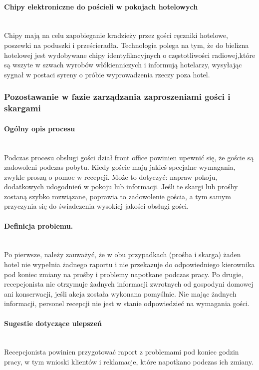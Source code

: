\documentclass[a4paper, 12pt]{article}
\begin{document}
\paragraph{Chipy elektroniczne do pościeli w pokojach hotelowych}\mbox{}\\
\hspace*{1cm} Chipy mają na celu zapobieganie kradzieży przez gości ręczniki hotelowe, poszewki na poduszki i prześcieradła. Technologia polega na tym, że do bielizna hotelowej jest wydobywane chipy identyfikacyjnych o częstotliwości radiowej,które są wszyte w szwach wyrobów włókienniczych i informują hotelarzy, wysyłając sygnał w postaci syreny o próbie wyprowadzenia rzeczy poza hotel.


\subsubsection{Pozostawanie w fazie zarządzania zaproszeniami gości i skargami}
\paragraph{Ogólny opis procesu}\mbox{}\\
\hspace*{1cm} Podczas procesu obsługi gości dział front office powinien upewnić się, że goście są zadowoleni podczas pobytu. Kiedy goście mają jakieś specjalne wymagania, zwykle proszą o pomoc w recepcji. Może to dotyczyć: napraw pokoju, dodatkowych udogodnień w pokoju lub informacji. Jeśli te skargi lub prośby zostaną szybko rozwiązane, poprawia to zadowolenie gościa, a tym samym przyczynia się do świadczenia wysokiej jakości obsługi gości.
\paragraph{Definicja problemu.}\mbox{}\\
\hspace*{1cm} Po pierwsze, należy zauważyć, że w obu przypadkach (prośba i skarga) żaden hotel nie wypełnia żadnego raportu i nie przekazuje do odpowiedniego kierownika pod koniec zmiany na prośby i problemy napotkane podczas pracy. Po drugie, recepcjonista nie otrzymuje żadnych informacji zwrotnych od gospodyni domowej ani konserwacji, jeśli akcja została wykonana pomyślnie. Nie mając żadnych informacji, personel recepcji nie jest w stanie odpowiedzieć na wymagania gości.
\paragraph{Sugestie dotyczące ulepszeń}\mbox{}\\
\hspace*{1cm} Recepcjonista powinien przygotować raport z problemami pod koniec godzin pracy, w tym wnioski klientów i reklamacje, które napotkano podczas ich zmiany.
\end{document}
